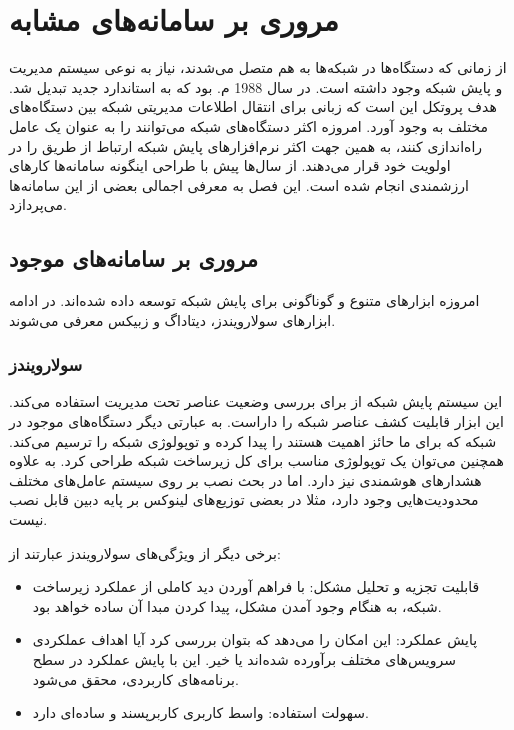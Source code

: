 \chapter{مروری بر سامانه‌های مشابه}

از زمانی که دستگاه‌ها در شبکه‌ها به هم متصل می‌شدند، نیاز به نوعی سیستم مدیریت و پایش شبکه وجود داشته است. در سال 1988 م. بود که  به استاندارد جدید تبدیل شد. هدف پروتکل  این است که زبانی برای انتقال اطلاعات مدیریتی شبکه بین دستگاه‌های مختلف به وجود آورد. امروزه اکثر دستگاه‌های شبکه می‌توانند  را به عنوان یک عامل راه‌اندازی کنند، به همین جهت اکثر نرم‌افزارهای پایش شبکه ارتباط از طریق  را در اولویت خود قرار می‌دهند\cite{noauthor_snmp_nodate}.
از سال‌ها پیش با طراحی اینگونه سامانه‌ها کارهای ارزشمندی انجام شده است. این فصل به معرفی اجمالی بعضی از این سامانه‌ها می‌پردازد.

\section{مروری بر سامانه‌های موجود}

امروزه ابزارهای متنوع و گوناگونی برای پایش شبکه توسعه داده شده‌اند. در ادامه ابزارهای سولارویندز، دیتاداگ و زبیکس معرفی می‌شوند.



\subsection{سولارویندز}

این سیستم پایش شبکه از  برای بررسی وضعیت عناصر تحت مدیریت استفاده می‌کند. این ابزار قابلیت کشف عناصر شبکه را داراست. به عبارتی دیگر دستگاه‌های موجود در شبکه که برای ما حائز اهمیت هستند را پیدا کرده و توپولوژی شبکه را ترسیم می‌کند. همچنین می‌توان یک توپولوژی مناسب برای کل زیرساخت شبکه طراحی کرد. به علاوه هشدارهای هوشمندی نیز دارد\cite{noauthor_solarwinds_nodate}. اما در بحث نصب بر روی سیستم‌ عامل‌های مختلف محدودیت‌هایی وجود دارد، مثلا در بعضی توزیع‌های لینوکس بر پایه دبین قابل نصب نیست.

\newpage


برخی دیگر از ویژگی‌های سولارویندز عبارتند از:

\begin{itemize}
    \item قابلیت تجزیه و تحلیل مشکل: با فراهم آوردن دید کاملی از عملکرد زیرساخت شبکه، به هنگام وجود آمدن مشکل، پیدا کردن مبدا آن ساده خواهد بود.
    \item پایش عملکرد: این امکان را می‌دهد که بتوان بررسی کرد آیا اهداف عملکردی سرویس‌های مختلف برآورده شده‌اند یا خیر. این با پایش عملکرد در سطح برنامه‌های کاربردی، محقق می‌شود.
    \item سهولت استفاده: واسط کاربری کاربرپسند و ساده‌ای دارد.
\end{itemize}



